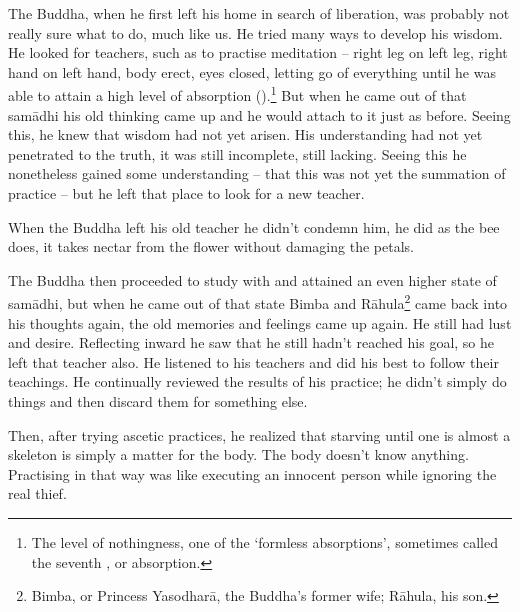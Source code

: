 The Buddha, when he first left his home in search of liberation, was probably not really sure what to do, much like us. He tried many ways to develop his wisdom. He looked for teachers, such as  to practise meditation -- right leg on left leg, right hand on left hand, body erect, eyes closed, letting go of everything until he was able to attain a high level of absorption ().\footnote{The level of nothingness, one of the `formless absorptions', sometimes called the seventh , or absorption.} But when he came out of that sam\=adhi his old thinking came up and he would attach to it just as before. Seeing this, he knew that wisdom had not yet arisen. His understanding had not yet penetrated to the truth, it was still incomplete, still lacking. Seeing this he nonetheless gained some understanding -- that this was not yet the summation of practice -- but he left that place to look for a new teacher.

When the Buddha left his old teacher he didn't condemn him, he did as the bee does, it takes nectar from the flower without damaging the petals.

The Buddha then proceeded to study with  and attained an even higher state of sam\=adhi, but when he came out of that state Bimba and R\=ahula\footnote{Bimba, or Princess Yasodhar\=a, the Buddha's former wife; R\=ahula, his son.} came back into his thoughts again, the old memories and feelings came up again. He still had lust and desire. Reflecting inward he saw that he still hadn't reached his goal, so he left that teacher also. He listened to his teachers and did his best to follow their teachings. He continually reviewed the results of his practice; he didn't simply do things and then discard them for something else.

Then, after trying ascetic practices, he realized that starving until one is almost a skeleton is simply a matter for the body. The body doesn't know anything. Practising in that way was like executing an innocent person while ignoring the real thief.

